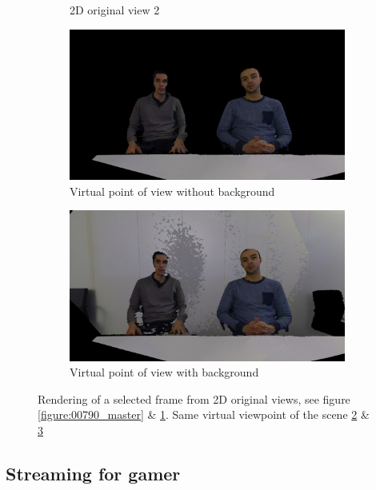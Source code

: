 \begin{figure}[H]
\begin{subfigure}[b]{0.48 \textwidth}
    \caption{2D original view 2}
    \label{figure:00790_sub}
  \end{subfigure}
  \hfill
  \begin{subfigure}[b]{0.48 \textwidth}
    \includegraphics[width=\textwidth]{images/scenario/00790_pc_2.jpg}
    \caption{Virtual point of view without background}
    \label{figure:00790_pc_2}
  \end{subfigure}
  \hfill
  \begin{subfigure}[b]{0.48 \textwidth}
    \includegraphics[width=\textwidth]{images/scenario/00790_background.jpg}
    \caption{Virtual point of view with background}
    \label{figure:00790_background}
  \end{subfigure}
  \caption{Rendering of a selected frame from 2D original views, see figure \ref{figure:00790_master} \& \ref{figure:00790_sub}. Same virtual viewpoint of the scene \ref{figure:00790_pc_2} \& \ref{figure:00790_background}}
  \label{figure:two_persons_virtualview}
\end{figure}

 
\subsection{Streaming for gamer}
 
